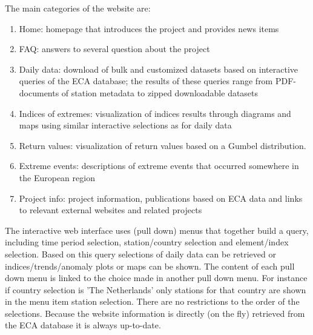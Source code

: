 \documentclass[a4paper,11pt]{article}
\begin{document}
The main categories of the website are:
\begin{enumerate}
\item Home: homepage that introduces the project and provides news items
\item FAQ: answers to several question about the project
\item Daily data: download of bulk and customized datasets based on
      interactive queries of the ECA database; the results of these
      queries range from PDF-documents of station metadata to zipped
      downloadable datasets
\item Indices of extremes: visualization of indices results through
      diagrams and maps using similar interactive selections as for
      daily data
\item Return values: visualization of return values based on a Gumbel
      distribution.
\item Extreme events: descriptions of extreme events that occurred
      somewhere in the European region
\item Project info: project information, publications based on ECA
      data and links to relevant external websites and related
      projects
\end{enumerate}
The interactive web interface uses (pull down) menus that together
build a query, including time period selection, station/country
selection and element/index selection. Based on this query selections
of daily data can be retrieved or indices/trends/anomaly plots or maps
can be shown. The content of each pull down menu is linked to the
choice made in another pull down menu. For instance if country
selection is 'The Netherlands' only stations for that country are
shown in the menu item station selection. There are no restrictions to
the order of the selections. Because the website information is
directly (on the fly) retrieved from the ECA database it is always
up-to-date.

\newpage


\end{document}
